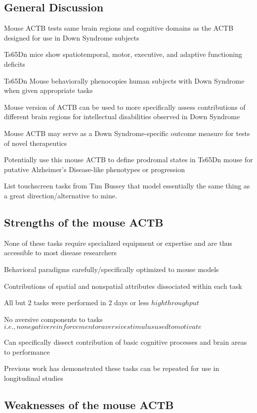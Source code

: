 \documentclass{article}
\begin{document}
\subsection{General Discussion}

Mouse ACTB tests same brain regions and cognitive domains as the ACTB designed for use in Down Syndrome subjects

Ts65Dn mice show spatiotemporal, motor, executive, and adaptive functioning deficits

Ts65Dn Mouse behaviorally phenocopies human subjects with Down Syndrome when given appropriate tasks

Mouse version of ACTB can be used to more specifically assess contributions of different brain regions for intellectual disabilities observed in Down Syndrome

Mouse ACTB may serve as a Down Syndrome-specific outcome measure for tests of novel therapeutics

Potentially use this mouse ACTB to define prodromal states in Ts65Dn mouse for putative Alzheimer's Disease-like phenotypes or progression

List touchscreen tasks from Tim Bussey that model essentially the same thing as a great direction/alternative to mine.

\subsection{Strengths of the mouse ACTB}

None of these tasks require specialized equipment or expertise and are thus accessible to most disease researchers

Behavioral paradigms carefully/specifically optimized to mouse models

Contributions of spatial and nonspatial attributes dissociated within each task

All but 2 tasks were performed in 2 days or less \(high throughput\)

No aversive components to tasks \(i.e., no negative reinforcement or aversive stimulus used to motivate\)

Can specifically dissect contribution of basic cognitive processes and  brain areas to performance

Previous work has demonstrated these tasks can be repeated for use in longitudinal studies

\subsection{Weaknesses of the mouse ACTB}
\end{document}
